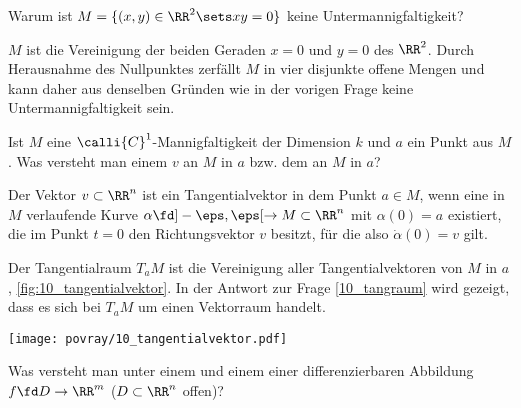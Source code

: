 \begin{frage}
  Warum ist $M=\{ (x,y) \in \RR^2 \sets xy=0 \}$ keine 
  Untermannigfaltigkeit?
\end{frage}

\begin{antwort}
  $M$ ist die Vereinigung der beiden Geraden $x=0$ und $y=0$ des 
  $\RR^2$. Durch Herausnahme des Nullpunktes zerfällt $M$ in 
  vier disjunkte offene Mengen und kann daher aus denselben Gründen 
  wie in der vorigen Frage keine Untermannigfaltigkeit sein.\AntEnd
\end{antwort}



\begin{frage}
  Ist $M$ eine $\calli{C}^1$-Mannigfaltigkeit der Dimension $k$ und $a$ ein Punkt aus $M$. Was versteht man einem  $v$ an $M$ in $a$ bzw.  dem  an $M$ in $a$?
\end{frage}

\begin{antwort}
  \Ant Der Vektor $v \subset \RR^n$ ist ein Tangentialvektor in dem Punkt 
  $a\in M$, wenn eine in $M$ verlaufende 
  Kurve $\alpha \fd ]-\eps, \eps[ \to M \subset \RR^n$ 
  mit $\alpha(0)=a$ existiert, die im Punkt  
  $t=0$ den Richtungsvektor $v$ besitzt, für die 
  also $\dot{\alpha}(0)=v$ gilt. 

  \medskip
  Der Tangentialraum $T_aM $ ist die Vereinigung aller Tangentialvektoren 
  von $M$ in $a$, \sieheAbbildung\ref{fig:10_tangentialvektor}. 
  In der Antwort zur Frage \ref{10_tangraum} wird gezeigt, dass 
  es sich bei $T_aM $ um einen Vektorraum handelt. \AntEnd 
  
  \begin{center}
    \texttt{[image: povray/10\_tangentialvektor.pdf]}
    \label{fig:10_tangentialvektor}
  \end{center}
\end{antwort} 



\begin{frage}
  Was versteht man unter einem  
  und einem  einer differenzierbaren 
  Abbildung $f\fd D\to \RR^m$ ($D\subset \RR^n$ offen)?
\end{frage}  


